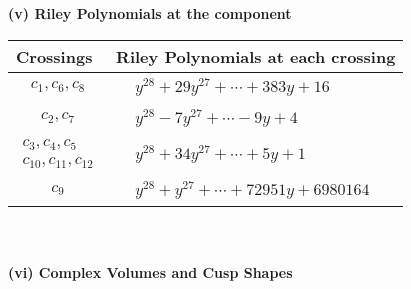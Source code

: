 \documentclass[1p]{elsarticle_modified}
\theoremstyle{definition}
\begin{document}
\newpage\renewcommand{\arraystretch}{1}
\flushleft \textbf{(v) Riley Polynomials at the component}\newline \\
\begin{tabular}{m{50pt}|m{274pt}}
Crossings & \hspace{64pt}Riley Polynomials at each crossing \\
\hline $$\begin{aligned}c_{1},c_{6},c_{8}\end{aligned}$$&$\begin{aligned}
&y^{28}+29 y^{27}+\cdots+383 y+16
\end{aligned}$\\
\hline $$\begin{aligned}c_{2},c_{7}\end{aligned}$$&$\begin{aligned}
&y^{28}-7 y^{27}+\cdots-9 y+4
\end{aligned}$\\
\hline $$\begin{aligned}c_{3},c_{4},c_{5}\\c_{10},c_{11},c_{12}\end{aligned}$$&$\begin{aligned}
&y^{28}+34 y^{27}+\cdots+5 y+1
\end{aligned}$\\
\hline $$\begin{aligned}c_{9}\end{aligned}$$&$\begin{aligned}
&y^{28}+y^{27}+\cdots+72951 y+6980164
\end{aligned}$\\
\hline
\end{tabular}\\~\\
\newpage\flushleft \textbf{(vi) Complex Volumes and Cusp Shapes}
\end{document}
